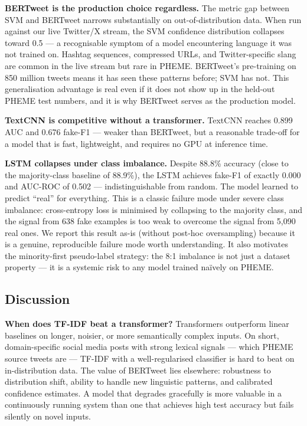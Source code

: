\documentclass[sigconf]{acmart}
\begin{document}
\textbf{BERTweet is the production choice regardless.} The metric gap between SVM and
BERTweet narrows substantially on out-of-distribution data. When run against our live
Twitter/X stream, the SVM confidence distribution collapses toward 0.5 — a recognisable
symptom of a model encountering language it was not trained on. Hashtag sequences,
compressed URLs, and Twitter-specific slang are common in the live stream but rare in
PHEME. BERTweet's pre-training on 850 million tweets means it has seen these patterns
before; SVM has not. This generalisation advantage is real even if it does not show up
in the held-out PHEME test numbers, and it is why BERTweet serves as the production model.

\textbf{TextCNN is competitive without a transformer.} TextCNN reaches 0.899 AUC and
0.676 fake-F1 — weaker than BERTweet, but a reasonable trade-off for a model that is
fast, lightweight, and requires no GPU at inference time.

\textbf{LSTM collapses under class imbalance.} Despite 88.8\% accuracy (close to the
majority-class baseline of 88.9\%), the LSTM achieves fake-F1 of exactly 0.000 and
AUC-ROC of 0.502 — indistinguishable from random. The model learned to predict ``real''
for everything. This is a classic failure mode under severe class imbalance: cross-entropy
loss is minimised by collapsing to the majority class, and the signal from 638 fake
examples is too weak to overcome the signal from 5,090 real ones. We report this result
as-is (without post-hoc oversampling) because it is a genuine, reproducible failure mode
worth understanding. It also motivates the minority-first pseudo-label strategy: the
8:1 imbalance is not just a dataset property — it is a systemic risk to any model
trained naïvely on PHEME.

\subsection{Discussion}

\textbf{When does TF-IDF beat a transformer?} Transformers outperform linear baselines on
longer, noisier, or more semantically complex inputs. On short, domain-specific social media
posts with strong lexical signals — which PHEME source tweets are — TF-IDF with a
well-regularised classifier is hard to beat on in-distribution data. The value of BERTweet
lies elsewhere: robustness to distribution shift, ability to handle new linguistic patterns,
and calibrated confidence estimates. A model that degrades gracefully is more valuable in a
continuously running system than one that achieves high test accuracy but fails silently
on novel inputs.
\end{document}

